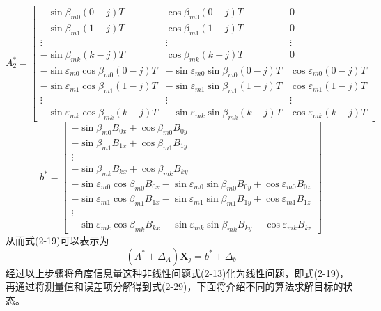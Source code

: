 \begin{equation}
	A_{2}^* = \left[\begin{array}{ccc}
		-\sin\beta_{m0}(0-j)T & \cos\beta_{m0}(0-j)T & 0 \\
		-\sin\beta_{m1}(1-j)T & \cos\beta_{m1}(1-j)T & 0 \\
		\vdots & \vdots & \vdots \\
		-\sin\beta_{mk}(k-j)T & \cos\beta_{mk}(k-j)T & 0 \\ \hline
		-\sin\varepsilon_{m0}\cos\beta_{m0}(0-j)T & -\sin\varepsilon_{m0}\sin\beta_{m0}(0-j)T & \cos\varepsilon_{m0}(0-j)T \\
		-\sin\varepsilon_{m1}\cos\beta_{m1}(1-j)T & -\sin\varepsilon_{m1}\sin\beta_{m1}(1-j)T & \cos\varepsilon_{m1}(1-j)T \\
		\vdots & \vdots & \vdots \\
		-\sin\varepsilon_{mk}\cos\beta_{mk}(k-j)T & -\sin\varepsilon_{mk}\sin\beta_{mk}(k-j)T & \cos\varepsilon_{mk}(k-j)T
	\end{array}\right]
\end{equation}
\begin{equation}
	b^* = \left[\begin{array}{c}
		-\sin\beta_{m0}B_{0x} + \cos\beta_{m0}B_{0y} \\
		-\sin\beta_{m1}B_{1x} + \cos\beta_{m1}B_{1y} \\
		\vdots \\
		-\sin\beta_{mk}B_{kx} + \cos\beta_{mk}B_{ky} \\ \hline
		-\sin\varepsilon_{m0}\cos\beta_{m0}B_{0x}-\sin\varepsilon_{m0}\sin\beta_{m0}B_{0y} + \cos\varepsilon_{m0}B_{0z} \\
		-\sin\varepsilon_{m1}\cos\beta_{m1}B_{1x}-\sin\varepsilon_{m1}\sin\beta_{m1}B_{1y} + \cos\varepsilon_{m1}B_{1z} \\
		\vdots \\
		-\sin\varepsilon_{mk}\cos\beta_{mk}B_{kx}-\sin\varepsilon_{mk}\sin\beta_{mk}B_{ky} + \cos\varepsilon_{mk}B_{kz} 
	\end{array}
	\right]
\end{equation}
从而式(2-19)可以表示为
\begin{equation}
	(A^* + \Delta_A)\bm{X}_j = b^* + \Delta_b
\end{equation}
经过以上步骤将角度信息量这种非线性问题式(2-13)化为线性问题，即式(2-19)，再通过将测量值和误差项分解得到式(2-29)，下面将介绍不同的算法求解目标的状态。